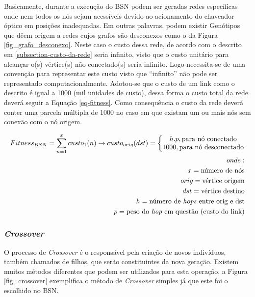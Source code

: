 Basicamente, durante a execução do BSN podem ser geradas redes específicas onde nem todos os nós sejam acessíveis devido ao acionamento do chaveador óptico em posições inadequadas. Em outras palavras, podem existir Genótipos que dêem origem a redes cujos grafos são desconexos como o da Figura \ref{fig_grafo_desconexo}. Neste caso o custo dessa rede, de acordo com o descrito em \ref{subsection-custo-da-rede} seria infinito, visto que o custo unitário para alcançar o(s) vértice(s) não conectado(s) seria infinito. Logo necessita-se de uma convenção para representar este custo visto que ``infinito'' não pode ser representado computacionalmente. Adotou-se que o custo de um link como o descrito é igual a 1000 (mil unidades de custo), dessa forma o custo total da rede deverá seguir a Equação \ref{eq-fitness}. Como consequência o custo da rede deverá conter uma parcela múltipla de 1000 no caso em que existam um ou mais nós sem conexão com o nó origem. 

\setcounter{equation}{0} \renewcommand{\theequation}{\arabic{equation}}
\begin{equation}
\begin{split}
Fitness_{BSN} = \sum_{n=1}^{x}custo_{1}(n) \rightarrow custo_{orig}(dst)=\left\{\begin{matrix}
h.p, \textup{para nó conectado}\\ 1000, \textup{para nó desconectado}
\end{matrix}\right.
\\onde:\\
x=\textup{número de nós}
\\orig=\textup{vértice origem}
\\dst=\textup{vértice destino}
\\h=\textup{número de \emph{hops} entre orig e dst}
\\p=\textup{peso do \emph{hop} em questão (custo do link)}
\end{split}
\label{eq-fitness}
\end{equation}

\subsubsection{\emph{Crossover}}
\label{cap-crossover}
O processo de \emph{Crossover} é o responsável pela criação de novos indivíduos, também chamados de filhos, que serão constituintes da nova geração. Existem muitos métodos diferentes que podem ser utilizados para esta operação, a Figura \ref{fig_crossover} exemplifica o método de \emph{Crossover} simples já que este foi o escolhido no BSN.

